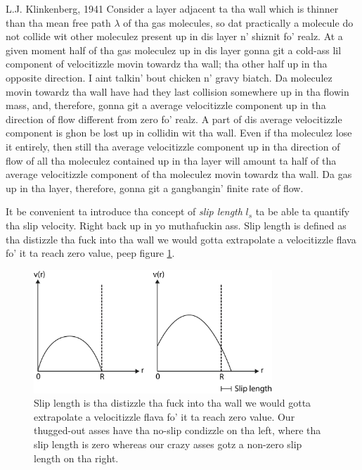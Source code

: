 \begin{aquote}{L.J. Klinkenberg, 1941}
Consider a layer adjacent ta tha wall which is thinner than tha mean free path $\lambda$ of tha gas molecules, so dat practically a molecule do not collide wit other moleculez present up in dis layer n' shiznit fo' realz. At a given moment half of tha gas moleculez up in dis layer gonna git a cold-ass lil component of velocitizzle movin towardz tha wall; tha other half up in tha opposite direction. I aint talkin' bout chicken n' gravy biatch. Da moleculez movin towardz tha wall have had they last collision somewhere up in tha flowin mass, and, therefore, gonna git a average velocitizzle component up in tha direction of flow different from zero fo' realz. A part of dis average velocitizzle component is ghon be lost up in collidin wit tha wall. Even if tha moleculez lose it entirely, then still tha average velocitizzle component up in tha direction of flow of all tha moleculez contained up in tha layer will amount ta half of tha average velocitizzle component of tha moleculez movin towardz tha wall. Da gas up in tha layer, therefore, gonna git a gangbangin' finite rate of flow.
\end{aquote}
It be convenient ta introduce tha concept of \textit{slip length} $l_s$ ta be able ta quantify tha slip velocity. Right back up in yo muthafuckin ass. Slip length is defined as tha distizzle tha fuck into tha wall we would gotta extrapolate a velocitizzle flava fo' it ta reach zero value, peep figure \ref{fig:slip_length}.
\begin{figure}[h!]
\begin{center}
\includegraphics[width=0.8\textwidth, trim=0cm 0cm 0cm 0cm, clip]{DSMC/figures/slip_length.eps}
\end{center}
\caption{Slip length is tha distizzle tha fuck into tha wall we would gotta extrapolate a velocitizzle flava fo' it ta reach zero value. Our thugged-out asses have tha no-slip condizzle on tha left, where tha slip length is zero whereas our crazy asses gotz a non-zero slip length on tha right.}
\label{fig:slip_length}
\end{figure}
